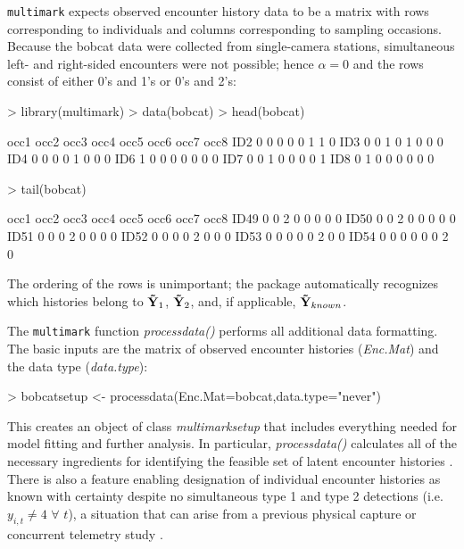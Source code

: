 \documentclass[12pt]{article}
\begin{document}
\verb|multimark| expects observed encounter history data to be a matrix with rows corresponding to individuals and columns corresponding to sampling occasions. Because the bobcat data were collected from single-camera stations, simultaneous left- and right-sided encounters were not possible; hence $\alpha=0$ and the rows consist of either 0's and 1's or 0's and 2's:
\begin{Schunk}
\begin{Sinput}
> library(multimark)
> data(bobcat)
> head(bobcat)
\end{Sinput}
\begin{Soutput}
    occ1 occ2 occ3 occ4 occ5 occ6 occ7 occ8
ID2    0    0    0    0    0    1    1    0
ID3    0    0    1    0    1    0    0    0
ID4    0    0    0    0    1    0    0    0
ID6    1    0    0    0    0    0    0    0
ID7    0    0    1    0    0    0    0    1
ID8    0    1    0    0    0    0    0    0
\end{Soutput}
\begin{Sinput}
> tail(bobcat)
\end{Sinput}
\begin{Soutput}
     occ1 occ2 occ3 occ4 occ5 occ6 occ7 occ8
ID49    0    0    2    0    0    0    0    0
ID50    0    0    2    0    0    0    0    0
ID51    0    0    0    2    0    0    0    0
ID52    0    0    0    0    2    0    0    0
ID53    0    0    0    0    0    2    0    0
ID54    0    0    0    0    0    0    2    0
\end{Soutput}
\end{Schunk}
The ordering of the rows is unimportant; the package automatically recognizes which histories belong to ${\bf {\tilde Y}}_1$, ${\bf {\tilde Y}}_2$, and, if applicable, ${\bf {\tilde Y}}_{known}$.

The \verb|multimark| function \textit{processdata()} performs all additional data formatting. The basic inputs are the matrix of observed encounter histories (\textit{Enc.Mat}) and the data type (\textit{data.type}):
\begin{Schunk}
\begin{Sinput}
> bobcatsetup <- processdata(Enc.Mat=bobcat,data.type="never")
\end{Sinput}
\end{Schunk}
This creates an object of class \textit{multimarksetup} that includes everything needed for model fitting and further analysis. In particular, \textit{processdata()} calculates all of the necessary ingredients for identifying the feasible set of latent encounter histories \citep[for technical details see][]{BonnerHolmberg2013,McClintockEtAl2013a}. There is also a feature enabling designation of individual encounter histories as known with certainty despite no simultaneous type 1 and type 2 detections (i.e. $y_{i,t} \ne 4$ $\forall$ $t$), a situation that can arise from a previous physical capture or concurrent telemetry study \citep[e.g.][]{McClintockEtAl2013a}.
\end{document}
